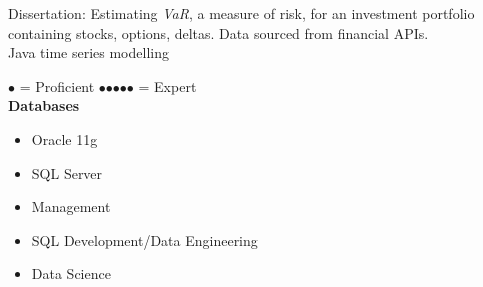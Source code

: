 
\makecvheader



\faFile*[regular] Dissertation: Estimating \textit{VaR}, a measure of risk, for an investment portfolio containing stocks, options, deltas. Data sourced from financial APIs.
\\\smallskip
%
\faCode Java
\faChartLine  time series modelling

\divider
{}





\small{$\bullet$  = Proficient\hfill 
$\bullet$$\bullet$$\bullet$$\bullet$$\bullet$ = Expert}\\


\textbf{\faDatabase Databases}
\begin{itemize}
    \item Oracle 11g
    \item SQL Server
\end{itemize}

\begin{itemize}
    \item \textcolor{emphasis}{Management}
\end{itemize}
\divider\smallskip

\begin{itemize}
    \item \textcolor{emphasis}{SQL Development/Data Engineering}
\end{itemize}
\divider\smallskip

\begin{itemize}
    \item \textcolor{emphasis}{Data Science}
\end{itemize}
\divider\smallskip



